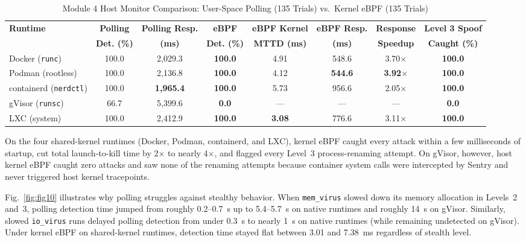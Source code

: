 \documentclass[conference]{IEEEtran}
\begin{document}
\begin{table}[t]
\centering
\caption{Module 4 Host Monitor Comparison: User-Space Polling (135 Trials) vs.\ Kernel eBPF (135 Trials)}
\label{tab:m4_ebpf}
\begin{tabular}{lccccccc}
\toprule
\textbf{Runtime} & \textbf{Polling} & \textbf{Polling Resp.} & \textbf{eBPF} & \textbf{eBPF Kernel} & \textbf{eBPF Resp.} & \textbf{Response} & \textbf{Level 3 Spoof} \\
 & \textbf{Det. (\%)} & \textbf{(ms)} & \textbf{Det. (\%)} & \textbf{MTTD (ms)} & \textbf{(ms)} & \textbf{Speedup} & \textbf{Caught (\%)} \\
\midrule
Docker (\texttt{runc})        & 100.0 & 2,029.3 & \textbf{100.0} & 4.91 & 548.6 & 3.70$\times$ & \textbf{100.0} \\
Podman (rootless)             & 100.0 & 2,136.8 & \textbf{100.0} & 4.12 & \textbf{544.6} & \textbf{3.92$\times$} & \textbf{100.0} \\
containerd (\texttt{nerdctl}) & 100.0 & \textbf{1,965.4} & \textbf{100.0} & 5.73 & 956.6 & 2.05$\times$ & \textbf{100.0} \\
gVisor (\texttt{runsc})       & 66.7  & 5,399.6 & \textbf{0.0}   & ---  & ---   & ---          & \textbf{0.0}   \\
LXC (system)                  & 100.0 & 2,412.9 & \textbf{100.0} & \textbf{3.08} & 776.6 & 3.11$\times$ & \textbf{100.0} \\
\bottomrule
\end{tabular}
\end{table}

On the four shared-kernel runtimes (Docker, Podman, containerd, and LXC), kernel eBPF caught every attack within a few milliseconds of startup, cut total launch-to-kill time by 2$\times$ to nearly 4$\times$, and flagged every Level~3 process-renaming attempt. On gVisor, however, host kernel eBPF caught zero attacks and saw none of the renaming attempts because container system calls were intercepted by Sentry and never triggered host kernel tracepoints.

Fig.~\ref{fig:fig10} illustrates why polling struggles against stealthy behavior. When \texttt{mem\_virus} slowed down its memory allocation in Levels~2 and~3, polling detection time jumped from roughly 0.2--0.7~s up to 5.4--5.7~s on native runtimes and roughly 14~s on gVisor. Similarly, slowed \texttt{io\_virus} runs delayed polling detection from under 0.3~s to nearly 1~s on native runtimes (while remaining undetected on gVisor). Under kernel eBPF on shared-kernel runtimes, detection time stayed flat between 3.01 and 7.38~ms regardless of stealth level.
\end{document}

